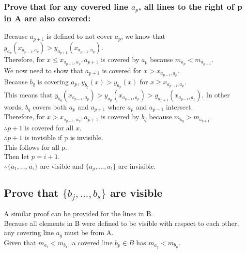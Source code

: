 \documentclass{article}
\begin{document}
    \subsubsection*{Prove that for any covered line $a_{p}$, all lines to the right of p in A are also covered:}
        Because $a_{p+1}$ is defined to not cover $a_p$, we know that $y_{a_{p}}(x_{a_{p-1}, a_{p}}) > y_{a_{p+1}}(x_{a_{p-1}, a_{p}})$.\\
        Therefore, for $x \leq x_{a_{p-1},a_{p}}, a_{p+1}$ is covered by $a_p$ because $m_{a_p} < m_{a_{p+1}}$.\\
        We now need to show that $a_{p+1}$ is covered for $x > x_{a_{p-1},a_{p}}$.\\
        Because $b_q$ is covering $a_p$, $y_{b_{q}}(x) > y_{a_{p}}(x)$ for $x \geq x_{a_{p-1},a_{p}}$.\\
        This means that $y_{b_{q}}(x_{a_{p-1}, a_{p}}) > y_{a_{p}}(x_{a_{p-1}, a_{p}}) > y_{a_{p+1}}(x_{a_{p-1}, a_{p}})$.  In other words, $b_{q}$ covers both $a_{p}$ and $a_{p+1}$ where $a_{p}$ and $a_{p-1}$ intersect.\\
        Therefore, for $x > x_{a_{p-1},a_{p}}, a_{p+1}$ is covered by $b_q$ because $m_{b_q} > m_{a_{p+1}}$.\\
        $\therefore p+1$ is covered for all $x$.\\
        $\therefore p+1$ is invisible if p is invisible.\\
        This follows for all p.\\
        Then let $p = i + 1$.\\
        $\therefore \{a_1,...,a_i\}$ are visible and $\{a_p,...,a_t\}$ are invisible.\\

\subsection*{Prove that $\{b_{j},...,b_{s}\}$ are visible}
    A similar proof can be provided for the lines in B.\\
    Because all elements in B were defined to be visible with respect to each other, any covering line $a_{q}$ must be from A.\\
    Given that $m_{a_{t}} < m_{b_{1}}$, a covered line $b_{p} \in B$ has $m_{a_q} < m_{b_p}$.
    
\end{document}
